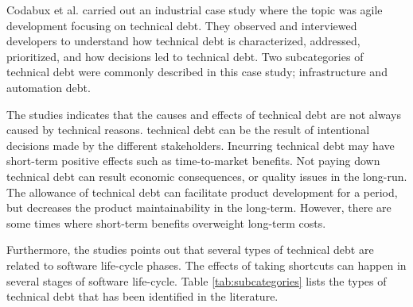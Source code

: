 {Codabux et al.\cite{p8-codabux} carried out an industrial case study where the topic was agile development focusing on technical debt. They observed and interviewed developers to understand how technical debt is characterized, addressed, prioritized, and how decisions led to technical debt. Two subcategories of technical debt were commonly described in this case study; infrastructure and automation debt. 

The studies indicates that the causes and effects of technical debt are not always caused by technical reasons. technical debt can be the result of intentional decisions made by the different stakeholders. Incurring technical debt may have short-term positive effects such as time-to-market benefits. Not paying down technical debt can result economic consequences, or quality issues in the long-run. The allowance of technical debt can facilitate product development for a period, but decreases the product maintainability in the long-term. However, there are some times where short-term benefits overweight long-term costs\cite{guo2011tracking}. 

Furthermore, the studies points out that several types of technical debt are related to software life-cycle phases. The effects of taking shortcuts can happen in several stages of software life-cycle. Table \ref{tab:subcategories} lists the types of technical debt that has been identified in the literature.

}
